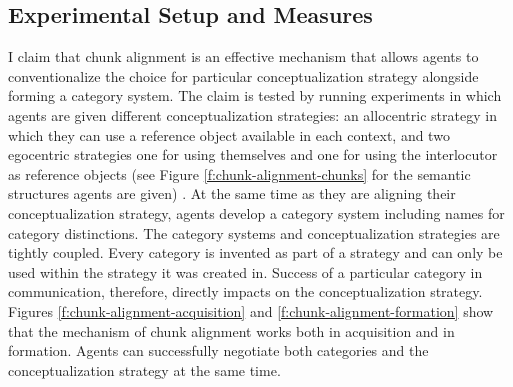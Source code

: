 \subsection{Experimental Setup and Measures}
I claim that chunk alignment is an effective mechanism that allows agents to
conventionalize the choice for particular conceptualization strategy alongside 
forming a category system. The claim is tested by running experiments in which agents 
are given different conceptualization strategies: an allocentric strategy 
in which they can use a reference object available in each context, 
and two egocentric strategies one for using themselves and one for using the interlocutor as reference objects
(see Figure \ref{f:chunk-alignment-chunks} for the semantic structures agents are given) . 
At the same time as they are aligning their conceptualization strategy, agents develop a 
category system including names for category distinctions. The category systems and conceptualization
strategies are tightly coupled. Every category is invented as part of a strategy and can only be used
within the strategy it was created in. Success of a particular category in communication,
therefore, directly impacts on the conceptualization strategy. Figures \ref{f:chunk-alignment-acquisition}
and \ref{f:chunk-alignment-formation} show that the mechanism of chunk alignment works both in acquisition 
and in formation. Agents can successfully negotiate both categories and the 
conceptualization strategy at the same time.

